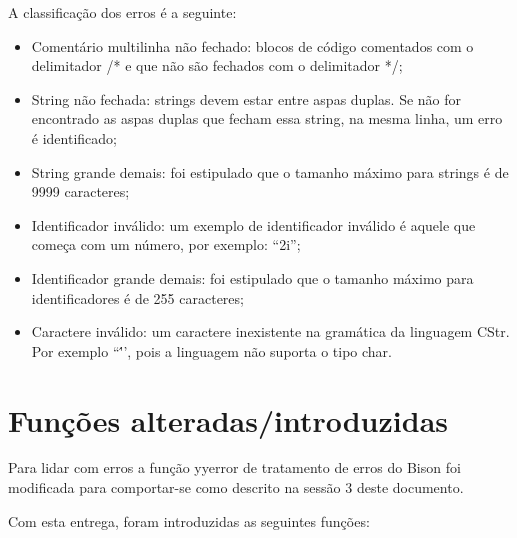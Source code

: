 \documentclass[12pt]{article}
\begin{document}
A classificação dos erros é a seguinte:
\begin{itemize}
	\item Comentário multilinha não fechado: blocos de código comentados com o delimitador /* e que não são fechados com o delimitador */;
	\item String não fechada: strings devem estar entre aspas duplas. Se não for encontrado as aspas duplas que fecham essa string, na mesma linha, um erro é identificado;
	\item String grande demais: foi estipulado que o tamanho máximo para strings é de 9999 caracteres;
	\item Identificador inválido: um exemplo de identificador inválido é aquele que começa com um número, por exemplo: ``2i'';
	\item Identificador grande demais: foi estipulado que o tamanho máximo para identificadores é de 255 caracteres;
	\item Caractere inválido: um caractere inexistente na gramática da linguagem CStr. Por exemplo ``\''', pois a linguagem não suporta o tipo char.\\
\end{itemize}

\section{Funções alteradas/introduzidas}

\indent


Para lidar com erros a função yyerror de tratamento de erros do Bison foi modificada para comportar-se como descrito na sessão 3 deste documento.

Com esta entrega, foram introduzidas as seguintes funções:
\end{document}
